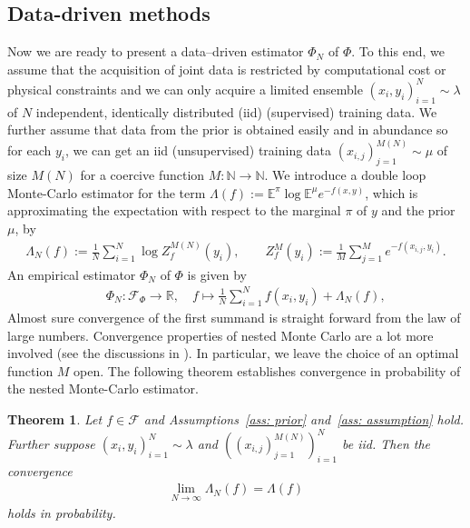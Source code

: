 \documentclass{amsart}
\newtheorem{theorem}{Theorem}[section]
\theoremstyle{definition}
\newcommand{\E}{{\mathbb E}}
\newcommand{\R}{{\mathbb R}}
\newcommand{\Natural}{\mathbb{N}}
\newcommand{\F}{\mathcal{F}}
\begin{document}
\subsection{Data-driven methods}
Now we are ready to present a data–driven estimator $\Phi_N$ of $\Phi$. To this end, we assume that the acquisition of joint data is restricted by computational cost or physical constraints and we can only acquire a limited ensemble $(x_i, y_i)_{i = 1}^{N} \sim \lambda$ of $N$ independent, identically distributed (iid) (supervised) training data. We further assume that data from the prior is obtained easily and in abundance so for each $y_i$, we can get an iid (unsupervised) training data $(x_{i, j})_{j =1}^{M(N)} \sim \mu$ of size $M(N)$ for a coercive function $M: \Natural \to \Natural$.
We introduce a double loop Monte-Carlo estimator for the term $\Lambda(f):= \E^\pi \log \E^\mu e^{-f(x, y)}$, which is approximating the expectation with respect to the marginal $\pi$ of $y$ and the prior $\mu$, by
\begin{eqnarray*}
    \Lambda_{N}(f) := \frac{1}{N} \sum_{i=1}^N \log Z_f^{M(N)}(y_i), \qquad Z_f^M(y_i) := \frac{1}{M} \sum_{j=1}^{M} e^{-f(x_{i, j}, y_i)}.
\end{eqnarray*}
An empirical estimator $\Phi_N$ of $\Phi$ is given by
\begin{eqnarray*}
    && \Phi_N: \F_\Phi \rightarrow \R, \quad
    f   \mapsto \frac{1}{N}\sum_{i = 1}^{N} f(x_i, y_i)  + \Lambda_N(f),
\end{eqnarray*}  
Almost sure convergence of the first summand is straight forward from the law of large numbers. Convergence properties of nested Monte Carlo  are a lot more involved (see the discussions in \cite{rainforth18onnestiting, bartuska2025doublelooprandomizedquasimontecarlo}). In particular, we leave the choice of an optimal function $M$ open.
The following theorem establishes convergence in probability of the nested Monte-Carlo estimator.
\begin{theorem}\label{lem: conv in p}
    Let $f \in \F$ and Assumptions~\ref{ass: prior} and~\ref{ass: assumption} hold. Further suppose $(x_i, y_i)_{i = 1}^{N} \sim \lambda$ and $((x_{i, j})_{j=1}^{M(N)})_{i =1}^{N}$ be iid. Then the convergence
    \begin{eqnarray*}
        \lim_{N \rightarrow \infty}\Lambda_{N}(f) = \Lambda(f)
    \end{eqnarray*}
    holds in probability.
\end{theorem}
\end{document}

